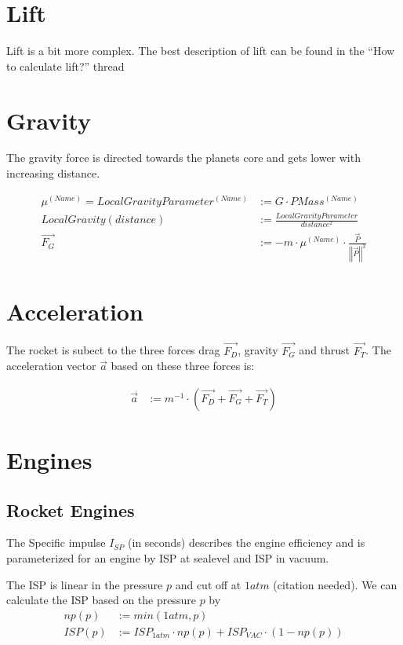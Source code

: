 \documentclass[11pt]{article}
\newcommand{\oa}[1]{\overrightarrow{#1}}
\newcommand{\F}[1]{\oa{F_{#1}}}
\newcommand{\Pos}{\oa{P}}
\newcommand{\absvec}[1]{\left|\left|{#1}\right|\right|}
\begin{document}
\section{Lift}

Lift is a bit more complex. The best description of lift can be found in the ``How to calculate lift?'' thread \cite{Lift}

\section{Gravity}

The gravity force is directed towards the planets core and gets lower
with increasing distance.

\begin{align}
  \mu^{(Name)} = LocalGravityParameter^{(Name)} &:= G \cdot PMass^{(Name)} \nonumber\\
  LocalGravity(distance) &:= \frac{LocalGravityParameter}{distance^2}\nonumber\\
  \F{G} &:= - m \cdot \mu^{(Name)}\cdot\frac{\Pos}{\absvec{\Pos}^3}
\end{align}

\section{Acceleration}

The rocket is subect to the three forces drag $\F{D}$, gravity $\F{G}$
and thrust $\F{T}$.  The acceleration vector $\oa{a}$ based on these
three forces is:

\begin{align}
  \oa{a} &:= m^{-1} \cdot(\F{D} + \F{G} + \F{T})
\end{align}

\section{Engines}

\subsection{Rocket Engines}

The Specific impulse $I_{SP}$ (in seconds) describes the engine
efficiency and is parameterized for an engine by ISP at sealevel and
ISP in vacuum.

The ISP is linear in the pressure $p$ and cut off at $1atm$
(citation needed).  We can calculate the ISP based on the pressure
$p$ by
\begin{align}
  np(p) &:= min(1 atm, p)\\
  ISP(p) &:= ISP_{1atm} \cdot np(p) + ISP_{VAC} \cdot (1-np(p))
\end{align}
\end{document}
